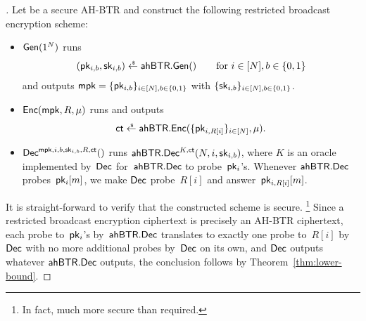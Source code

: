 \begin{proof}[]
Let
be a secure AH-BTR and
construct the following restricted broadcast encryption scheme:
\begin{itemize}
\item $\Gen(1^N)$ runs
\begin{align*}
(\pk_{i,b},\sk_{i,b})\draws\AHBTR.\Gen()\qquad\textup{for }i\in[N],b\in\bit
\end{align*}
and outputs ${\mpk=\{\pk_{i,b}\}_{i\in[N],b\in\bit}}$ with $\{\sk_{i,b}\}_{i\in[N],b\in\bit}$.
\item $\Enc(\mpk,R,\mu)$ runs and outputs
\begin{align*}
\ct\draws\AHBTR.\Enc(\{\pk_{i,R[i]}\}_{i\in[N]},\mu).
\end{align*}
\item $\Dec^{\mpk,i,b,\sk_{i,b},R,\ct}()$
runs $\AHBTR.\Dec^{K,\ct}(N,i,\sk_{i,b})$,
where $K$ is an oracle implemented by~$\Dec$ for~$\AHBTR.\Dec$ to probe~$\pk_i$'s.
Whenever $\AHBTR.\Dec$ probes~$\pk_i[m]$,
we make $\Dec$ probe~$R[i]$ and answer~$\pk_{i,R[i]}[m]$.
\end{itemize}
It is straight-forward to verify that the constructed scheme is secure.%
\footnote{In fact, much more secure than required.}
Since
a restricted broadcast encryption ciphertext is precisely an AH-BTR ciphertext,
each probe to~$\pk_i$'s by~$\AHBTR.\Dec$ translates to exactly one probe to~$R[i]$ by~$\Dec$ with no more additional probes by~$\Dec$ on its own, and
$\Dec$ outputs whatever $\AHBTR.\Dec$ outputs,
the conclusion follows by Theorem~\ref{thm:lower-bound}.
\end{proof}
